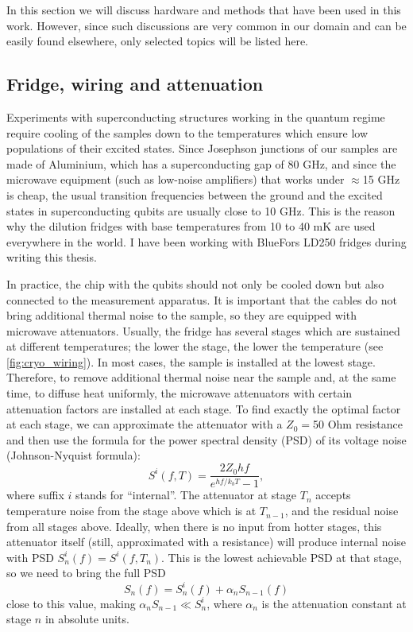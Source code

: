 In this section we will discuss hardware and methods that have been used in this work. However, since such discussions are very common in our domain and can be easily found elsewhere, only selected topics will be listed here. 

\subsection{Fridge, wiring and attenuation}

Experiments with superconducting structures working in the quantum regime require cooling of the samples down to the temperatures which ensure low populations of their excited states. Since Josephson junctions of our samples are made of Aluminium, which has a superconducting gap of 80 GHz, and since the microwave equipment (such as low-noise amplifiers) that works under $\approx$15 GHz is cheap, the usual transition frequencies between the ground and the excited states in superconducting qubits are usually close to 10 GHz. This is the reason why the dilution fridges with base temperatures from 10 to 40 mK are used everywhere in the world. I have been working with BlueFors LD250 fridges during writing this thesis.

In practice, the chip with the qubits should not only be cooled down but also connected to the measurement apparatus. It is important that the cables do not bring additional thermal noise to the sample, so they are equipped with microwave attenuators. Usually, the fridge has several stages which are sustained at different temperatures; the lower the stage, the lower the temperature (see \autoref{fig:cryo_wiring}). In most cases, the sample is installed at the lowest stage. Therefore, to remove additional thermal noise near the sample and, at the same time, to diffuse heat uniformly, the microwave attenuators with certain attenuation factors are installed at each stage. To find exactly the optimal factor at each stage, we can approximate the attenuator with a $Z_0=$50 Ohm resistance and then use the formula for the power spectral density (PSD) of its voltage noise (Johnson-Nyquist formula):
\begin{equation}
S^i(f, T) = \frac{2 Z_0 h f}{e^{h f/k_b T}-1},
\label{eq:JN_eq}
\end{equation}
where suffix $i$ stands for ``internal''. The attenuator at stage $T_n$ accepts temperature noise from the stage above which is at $T_{n-1}$, and the residual noise from all stages above. Ideally, when there is no input from hotter stages, this attenuator itself (still, approximated with a resistance) will produce internal noise with PSD $S_n^i(f) = S^i(f, T_n)$. This is the lowest achievable PSD at that stage, so we need to bring the full PSD
\begin{equation}
S_n(f) = S_n^i(f) + \alpha_n S_{n-1}(f)
\label{eq:full_th_PSD}
\end{equation}
close to this value, making $\alpha_n S_{n-1}\ll S^i_{n}$, where $\alpha_n$ is the attenuation constant  
at stage $n$ in absolute units.

